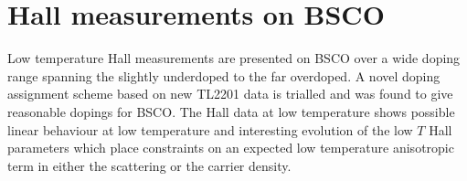\chapter{Hall measurements on \acs{BSCO}}

\begin{chapterabstract}
Low temperature Hall measurements are presented on \ac{BSCO} over a wide doping range spanning the slightly underdoped to the far overdoped. A novel doping assignment scheme based on new \ac{TL2201} data is trialled and was found to give reasonable dopings for \ac{BSCO}. The Hall data at low temperature shows possible linear behaviour at low temperature and interesting evolution of the low $T$ Hall parameters which place constraints on an expected low temperature anisotropic term in either the scattering or the carrier density.
\end{chapterabstract}











